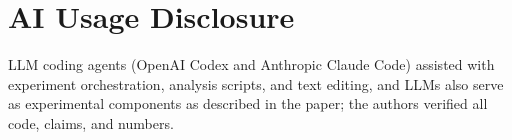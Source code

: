 \documentclass{article}
\begin{document}



\section*{AI Usage Disclosure}
LLM coding agents (OpenAI Codex and Anthropic Claude Code) assisted with experiment orchestration, analysis scripts, and text editing, and LLMs also serve as experimental components as described in the paper; the authors verified all code, claims, and numbers.

\clearpage

\end{document}
